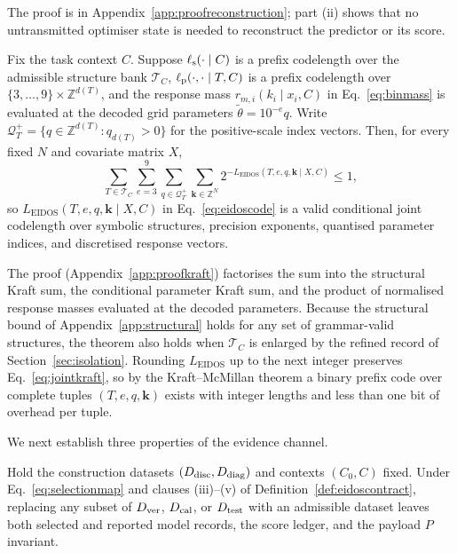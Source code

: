 The proof is in Appendix~\ref{app:proofreconstruction}; part (ii) shows that no untransmitted optimiser state is needed to reconstruct the predictor or its score.

\begin{theorem}\label{thm:jointkraft}
Fix the task context \(C\). Suppose \(\ell_{\rm s}(\cdot\mid C)\) is a prefix codelength over the admissible structure bank \(\mathcal T_C\), \(\ell_{\rm p}(\cdot,\cdot\mid T,C)\) is a prefix codelength over \(\{3,\ldots,9\}\times\mathbb Z^{d(T)}\), and the response mass \(r_{m,i}(k_i\mid x_i,C)\) in Eq.~\eqref{eq:binmass} is evaluated at the decoded grid parameters \(\widetilde\theta=10^{-e}q\). Write \(\mathcal Q_T^+=\{q\in\mathbb Z^{d(T)}:q_{d(T)}>0\}\) for the positive-scale index vectors. Then, for every fixed \(N\) and covariate matrix \(X\),
\begin{equation}\label{eq:jointkraft}
\sum_{T\in\mathcal T_C}\sum_{e=3}^{9}\sum_{q\in\mathcal Q_T^+}
\sum_{\mathbf k\in\mathbb Z^N}
2^{-L_{\mathrm{EIDOS}}(T,e,q,\mathbf k\mid X,C)}\le 1,
\end{equation}
so \(L_{\mathrm{EIDOS}}(T,e,q,\mathbf k\mid X,C)\) in Eq.~\eqref{eq:eidoscode} is a valid conditional joint codelength over symbolic structures, precision exponents, quantised parameter indices, and discretised response vectors.
\end{theorem}

The proof (Appendix~\ref{app:proofkraft}) factorises the sum into the structural Kraft sum, the conditional parameter Kraft sum, and the product of normalised response masses evaluated at the decoded parameters. Because the structural bound of Appendix~\ref{app:structural} holds for any set of grammar-valid structures, the theorem also holds when \(\mathcal T_C\) is enlarged by the refined record of Section~\ref{sec:isolation}. Rounding \(L_{\mathrm{EIDOS}}\) up to the next integer preserves Eq.~\eqref{eq:jointkraft}, so by the Kraft--McMillan theorem a binary prefix code over complete tuples \((T,e,q,\mathbf k)\) exists with integer lengths and less than one bit of overhead per tuple.

We next establish three properties of the evidence channel.

\begin{proposition}\label{prop:evidence}
Hold the construction datasets \((D_{\rm disc},D_{\rm diag})\) and contexts \((C_0,C)\) fixed. Under Eq.~\eqref{eq:selectionmap} and clauses (iii)--(v) of Definition~\ref{def:eidoscontract}, replacing any subset of \(D_{\rm ver}\), \(D_{\rm cal}\), or \(D_{\rm test}\) with an admissible dataset leaves both selected and reported model records, the score ledger, and the payload \(P\) invariant.
\end{proposition}

